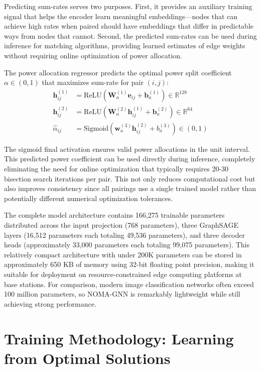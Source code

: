 Predicting sum-rates serves two purposes. First, it provides an auxiliary training signal that helps the encoder learn meaningful embeddings—nodes that can achieve high rates when paired should have embeddings that differ in predictable ways from nodes that cannot. Second, the predicted sum-rates can be used during inference for matching algorithms, providing learned estimates of edge weights without requiring online optimization of power allocation.

The power allocation regressor predicts the optimal power split coefficient $\alpha \in (0,1)$ that maximizes sum-rate for pair $(i,j)$:
\begin{equation}
\begin{aligned}
\mathbf{h}_{ij}^{(1)} &= \text{ReLU}(\mathbf{W}_a^{(1)} \mathbf{e}_{ij} + \mathbf{b}_a^{(1)}) \in \mathbb{R}^{128} \\
\mathbf{h}_{ij}^{(2)} &= \text{ReLU}(\mathbf{W}_a^{(2)} \mathbf{h}_{ij}^{(1)} + \mathbf{b}_a^{(2)}) \in \mathbb{R}^{64} \\
\hat{\alpha}_{ij} &= \text{Sigmoid}(\mathbf{w}_a^{(3)} \mathbf{h}_{ij}^{(2)} + b_a^{(3)}) \in (0,1)
\end{aligned}
\end{equation}

The sigmoid final activation ensures valid power allocations in the unit interval. This predicted power coefficient can be used directly during inference, completely eliminating the need for online optimization that typically requires 20-30 bisection search iterations per pair. This not only reduces computational cost but also improves consistency since all pairings use a single trained model rather than potentially different numerical optimization tolerances.

The complete model architecture contains 166,275 trainable parameters distributed across the input projection (768 parameters), three GraphSAGE layers (16,512 parameters each totaling 49,536 parameters), and three decoder heads (approximately 33,000 parameters each totaling 99,075 parameters). This relatively compact architecture with under 200K parameters can be stored in approximately 650 KB of memory using 32-bit floating point precision, making it suitable for deployment on resource-constrained edge computing platforms at base stations. For comparison, modern image classification networks often exceed 100 million parameters, so NOMA-GNN is remarkably lightweight while still achieving strong performance.

\section{Training Methodology: Learning from Optimal Solutions}


